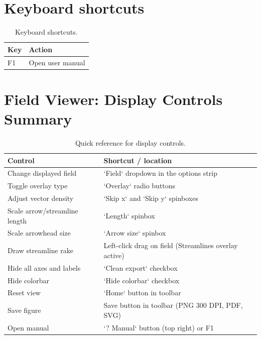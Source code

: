 \section{Keyboard shortcuts}

\begin{table}[htbp]
\centering
\caption{Keyboard shortcuts.}
\begin{tabular}{ll}
\toprule
\textbf{Key} & \textbf{Action} \\
\midrule
F1 & Open user manual \\
\bottomrule
\end{tabular}
\end{table}

\section{Field Viewer: Display Controls Summary}

\begin{table}[htbp]
\centering
\caption{Quick reference for display controls.}
\begin{tabular}{ll}
\toprule
\textbf{Control} & \textbf{Shortcut / location} \\
\midrule
Change displayed field     & `Field` dropdown in the options strip \\
Toggle overlay type        & `Overlay` radio buttons \\
Adjust vector density      & `Skip x` and `Skip y` spinboxes \\
Scale arrow/streamline length & `Length` spinbox \\
Scale arrowhead size       & `Arrow size` spinbox \\
Draw streamline rake       & Left-click drag on field (Streamlines overlay active) \\
Hide all axes and labels   & `Clean export` checkbox \\
Hide colorbar              & `Hide colorbar` checkbox \\
Reset view                 & `Home` button in toolbar \\
Save figure                & Save button in toolbar (PNG 300 DPI, PDF, SVG) \\
Open manual                & `? Manual` button (top right) or F1 \\
\bottomrule
\end{tabular}
\end{table}

\appendix

